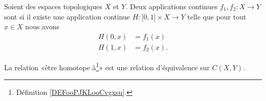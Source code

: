 \begin{definition}       \label{DEFooPJKLooCvgxsu}
    Soient des espaces topologiques \( X\) et \( Y\). Deux applications continues \( f_1,f_2\colon X\to Y\) sont  si il existe une application continue \( H\colon \mathopen[ 0 , 1 \mathclose]\times X\to Y \) telle que pour tout \( x\in X \) nous avons
    \begin{subequations}
        \begin{align}
            H(0,x)&=f_1(x)\\
            H(1,x)&=f_2(x).
        \end{align}
    \end{subequations}
\end{definition}

\begin{lemma}       \label{LEMooMGFZooGOaGYl}
    La relation «être homotope à\footnote{Définition \ref{DEFooPJKLooCvgxsu}.}»  est une relation d'équivalence sur \( C(X,Y)\).
\end{lemma}

